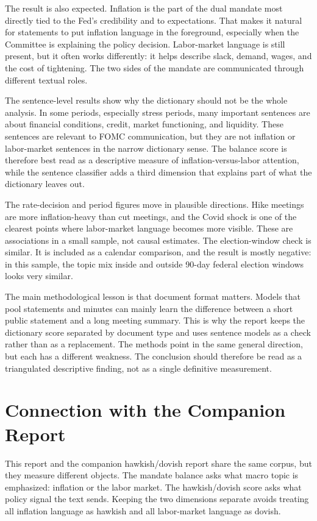 \documentclass{article}
\begin{document}
The result is also expected. Inflation is the part of the dual mandate most directly tied
to the Fed's credibility and to expectations. That makes it natural for statements to put
inflation language in the foreground, especially when the Committee is explaining the
policy decision. Labor-market language is still present, but it often works differently:
it helps describe slack, demand, wages, and the cost of tightening. The two sides of the
mandate are communicated through different textual roles.

The sentence-level results show why the dictionary should not be the whole analysis. In
some periods, especially stress periods, many important sentences are about financial
conditions, credit, market functioning, and liquidity. These sentences are relevant to
FOMC communication, but they are not inflation or labor-market sentences in the narrow
dictionary sense. The balance score is therefore best read as a descriptive measure of
inflation-versus-labor attention, while the sentence classifier adds a third dimension
that explains part of what the dictionary leaves out.

The rate-decision and period figures move in plausible directions. Hike meetings are
more inflation-heavy than cut meetings, and the Covid shock is one of the clearest points
where labor-market language becomes more visible. These are associations in a small
sample, not causal estimates. The election-window check is similar. It is included as a
calendar comparison, and the result is mostly negative: in this sample, the topic mix
inside and outside 90-day federal election windows looks very similar.

The main methodological lesson is that document format matters. Models that pool
statements and minutes can mainly learn the difference between a short public statement
and a long meeting summary. This is why the report keeps the dictionary score separated
by document type and uses sentence models as a check rather than as a replacement. The
methods point in the same general direction, but each has a different weakness. The
conclusion should therefore be read as a triangulated descriptive finding, not as a
single definitive measurement.

\section{Connection with the Companion Report}
\label{sec:companion}

This report and the companion hawkish/dovish report share the same corpus, but they
measure different objects. The mandate balance asks what macro topic is emphasized:
inflation or the labor market. The hawkish/dovish score asks what policy signal the text
sends. Keeping the two dimensions separate avoids treating all inflation language as
hawkish and all labor-market language as dovish.
\end{document}
